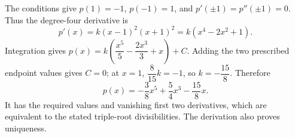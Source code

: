 The conditions give $p(1)=-1$, $p(-1)=1$, and $p'(\pm1)=p''(\pm1)=0$. Thus the degree-four derivative is
\[
p'(x)=k(x-1)^2(x+1)^2=k(x^4-2x^2+1).
\]
Integration gives $p(x)=k(\dfrac{x^5}{5}-\dfrac{2x^3}{3}+x)+C$. Adding the two prescribed endpoint values gives $C=0$; at $x=1$, $\dfrac{8}{15}k=-1$, so $k=-\dfrac{15}{8}$. Therefore
\[
\boxed{p(x)=-\dfrac{3}{8}x^5+\dfrac{5}{4}x^3-\dfrac{15}{8}x}.
\]
It has the required values and vanishing first two derivatives, which are equivalent to the stated triple-root divisibilities. The derivation also proves uniqueness.
